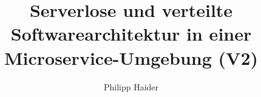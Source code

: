 \documentclass[master,german]{hgbthesis}
\title{Serverlose und verteilte Softwarearchitektur in einer Microservice-Umgebung (V2)}
\author{Philipp Haider}
\begin{document}

\frontmatter                    %

\maketitle
\tableofcontents

%		
%			

\mainmatter          %




%

\appendix                                            %


\MakeBibliography                        %

%

\end{document}
